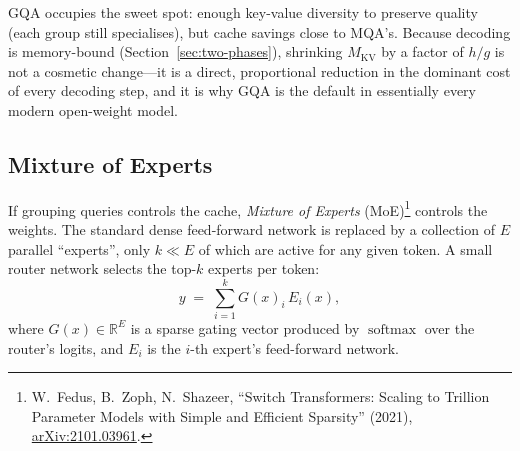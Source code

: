 \documentclass[11pt,a4paper]{article}
\theoremstyle{definition}
\theoremstyle{remark}
\theoremstyle{plain}
\newcommand{\R}{\mathbb{R}}
\newcommand{\softmax}{\operatorname{softmax}}
\newcommand{\arxivlink}[1]{\href{https://arxiv.org/abs/#1}{arXiv:#1}}
\begin{document}
GQA occupies the sweet spot: enough key-value diversity to preserve
quality (each group still specialises), but cache savings close to MQA's.
Because decoding is memory-bound (Section~\ref{sec:two-phases}), shrinking
$M_{\text{KV}}$ by a factor of $h/g$ is not a cosmetic change---it is a
direct, proportional reduction in the dominant cost of every decoding
step, and it is why GQA is the default in essentially every modern
open-weight model.

\subsection{Mixture of Experts}

If grouping queries controls the cache, \emph{Mixture of Experts}
(MoE)\footnote{W.\ Fedus, B.\ Zoph, N.\ Shazeer, ``Switch Transformers:
Scaling to Trillion Parameter Models with Simple and Efficient Sparsity''
(2021), \arxivlink{2101.03961}.} controls the weights. The standard dense
feed-forward network is replaced by a collection of $E$ parallel
``experts'', only $k \ll E$ of which are active for any given token. A
small router network selects the top-$k$ experts per token:
\begin{equation}
  y \;=\; \sum_{i=1}^{k} G(x)_i \, E_i(x),
  \label{eq:moe}
\end{equation}
where $G(x) \in \R^E$ is a sparse gating vector produced by $\softmax$
over the router's logits, and $E_i$ is the $i$-th expert's feed-forward
network.

\begin{center}
\end{center}
\end{document}
